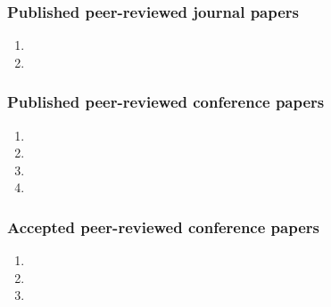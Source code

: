 \subsubsection{Published peer-reviewed journal papers}
\begin{enumerate}
	\item {}
	\item {}
\end{enumerate}

\subsubsection{Published peer-reviewed conference papers}
\begin{enumerate}
    \item {}
	\item {}
	\item {}
	\item {}
\end{enumerate}

\subsubsection{Accepted peer-reviewed conference papers}
\begin{enumerate}
	\item {}
	\item {}
	\item {}
\end{enumerate}

